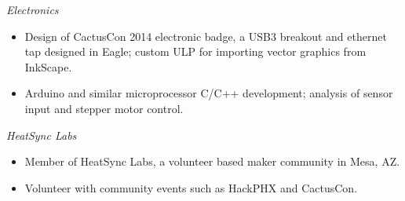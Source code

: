 \documentclass[line,margin]{res}
\begin{document}
\begin{resume}
          \emph{Electronics}
          \begin{itemize} \itemsep -2pt
          \item
            Design of CactusCon 2014 electronic badge, a USB3 breakout and ethernet tap designed in Eagle; custom ULP for importing
            vector graphics from InkScape.
          \item
            Arduino and similar microprocessor C/C++ development; analysis of sensor input and stepper motor control.
          \end{itemize}


          \emph{HeatSync Labs}
          \begin{itemize} \itemsep -2pt %
          \item
            Member of HeatSync Labs, a volunteer based maker community in Mesa, AZ.
          \item
            Volunteer with community events such as HackPHX and CactusCon.
          \end{itemize}\

\end{resume}
\end{document}
